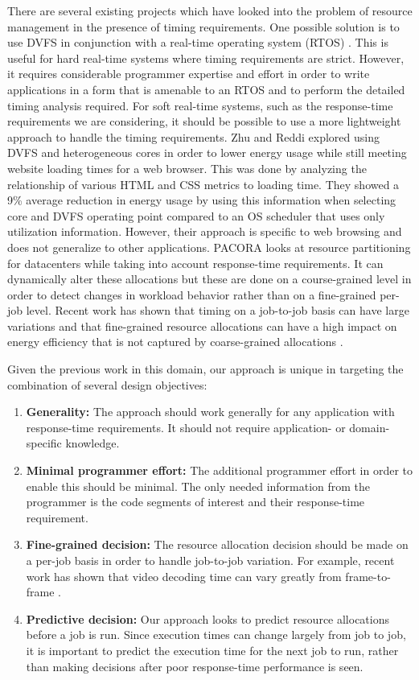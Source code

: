 There are several existing projects which have looked into the problem of
resource management in the presence of timing requirements. One possible
solution is to use DVFS in conjunction with a real-time operating system (RTOS)
\cite{rtdvfs-systor12}. This is useful for hard real-time systems where timing
requirements are strict. However, it requires considerable programmer expertise
and effort in order to write applications in a form that is amenable to an RTOS
and to perform the detailed timing analysis required. For soft real-time
systems, such as the response-time requirements we are considering, it should
be possible to use a more lightweight approach to handle the timing
requirements. Zhu and Reddi \cite{zhu-hpca13} explored using DVFS and
heterogeneous cores in order to lower energy usage while still meeting website
loading times for a web browser. This was done by analyzing the relationship of
various HTML and CSS metrics to loading time. They showed a 9\% average
reduction in energy usage by using this information when selecting core and
DVFS operating point compared to an OS scheduler that uses only utilization
information.  However, their approach is specific to web browsing and does not
generalize to other applications. PACORA \cite{pacora-hotpar11} looks at
resource partitioning for datacenters while taking into account response-time
requirements. It can dynamically alter these allocations but these are done on
a course-grained level in order to detect changes in workload behavior rather
than on a fine-grained per-job level. Recent work has shown that timing on a
job-to-job basis can have large variations \cite{atlas-rtas13} and that
fine-grained resource allocations can have a high impact on energy efficiency
that is not captured by coarse-grained allocations \cite{padmanabha-micro13}.

Given the previous work in this domain, our approach is unique in targeting the
combination of several design objectives:
\begin{enumerate}
  \item \textbf{Generality: } The approach should work generally for any
  application with response-time requirements. It should not require
  application- or domain-specific knowledge.
  \item \textbf{Minimal programmer effort: } The additional programmer effort
  in order to enable this should be minimal. The only needed information from
  the programmer is the code segments of interest and their response-time
  requirement.
  \item \textbf{Fine-grained decision: } The resource allocation decision
  should be made on a per-job basis in order to handle job-to-job variation.
  For example, recent work has shown that video decoding time can vary greatly
  from frame-to-frame \cite{atlas-rtas13}. 
  \item \textbf{Predictive decision: } Our approach looks to predict resource
  allocations before a job is run. Since execution times can change largely
  from job to job, it is important to predict the execution time for the next
  job to run, rather than making decisions after poor response-time performance
  is seen.
\end{enumerate}

